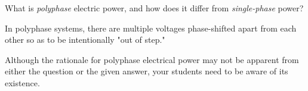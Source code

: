 

What is {\it polyphase} electric power, and how does it differ from {\it single-phase} power?







In polyphase systems, there are multiple voltages phase-shifted apart from each other so as to be intentionally "out of step."







Although the rationale for polyphase electrical power may not be apparent from either the question or the given answer, your students need to be aware of its existence.




